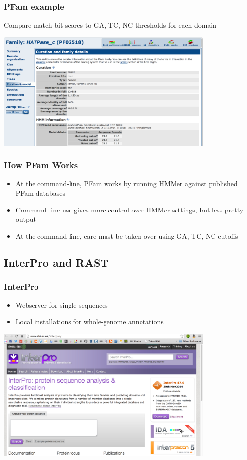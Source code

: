     \begin{frame}
      \frametitle{PFam example}  
      Compare match bit scores to GA, TC, NC thresholds for each domain
      \begin{center}
        \includegraphics[width=0.8\textwidth]{images/pfam10} 
      \end{center}      
    \end{frame}

    \begin{frame}
      \frametitle{How PFam Works}   
      \begin{itemize}
        \item At the command-line, PFam works by running HMMer against published PFam databases
        \item Command-line use gives more control over HMMer settings, but less pretty output
        \item At the command-line, care must be taken over using GA, TC, NC cutoffs
      \end{itemize}
    \end{frame}

    \subsection{InterPro and RAST}
    \begin{frame}
      \frametitle{InterPro}   
      \begin{itemize}
        \item Webserver for single sequences
        \item Local installations for whole-genome annotations
      \end{itemize}
      \begin{center}
        \includegraphics[width=0.8\textwidth]{images/interpro} 
      \end{center}        
    \end{frame}
    
